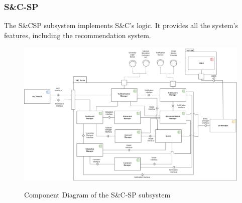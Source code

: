 \documentclass[a4paper,12pt]{article}
\begin{document}
\subsubsection{S\&C-SP}
The S\&CSP subsystem implements S\&C's logic. It provides all the system's features, including the recommendation system.
\begin{figure}%
\centering
\includegraphics[scale=0.50]{DD_figures/S&C.drawio.png}\\
\caption{Component Diagram of the S\&C-SP subsystem}
\end{figure}
\end{document}
